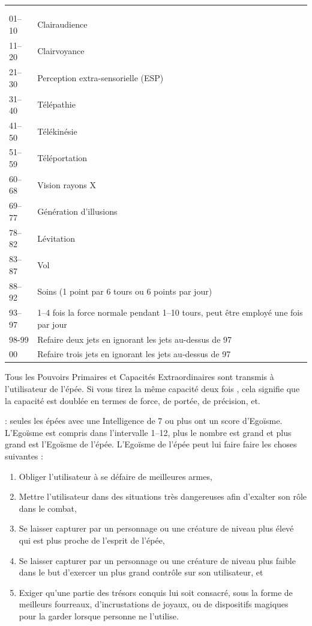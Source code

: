 \documentclass[12pt]{article}
\newcommand{\myunderline}[1]{\underline{\smash{#1}}}
\begin{document}
{{\begin{tabular}[t]{p{3cm}p{12cm}}
\multicolumn{2}{l}{\myunderline{\textbf{Table des Capacités Extraordinaires}}} \\
\textbf{\myunderline{Jet de dé}} & \myunderline{\textbf{Capacité}} \\
01--10 & Clairaudience \\
11--20 & Clairvoyance \\
21--30 & Perception extra-sensorielle (ESP) \\
31--40 & Télépathie \\
41--50 & Télékinésie \\
51--59 & Téléportation \\
60--68 & Vision rayons X \\
69--77 & Génération d'illusions \\
78--82 & Lévitation \\
83--87 & Vol \\
88--92 & Soins (1 point par 6 tours ou 6 points par jour) \\
93--97 & 1--4 fois la force normale pendant 1--10 tours, peut être employé une fois par jour \\
98-99 & Refaire deux jets en ignorant les jets au-dessus de 97 \\
\hspace{0.4cm}00 & Refaire trois jets en ignorant les jets au-dessus de 97 \\
\end{tabular}

\medskip

Tous les Pouvoirs Primaires et Capacités Extraordinaires sont transmis à l'utilisateur de l'épée. Si vous tirez la même capacité deux fois , cela signifie que la capacité est doublée en termes de force, de portée, de précision, et.

\bigskip

\myunderline{\textbf{Egoïsme}} : seules les épées avec une Intelligence de 7 ou plus ont un score d'Egoïsme. L'Egoïsme est compris dans l'intervalle 1--12, plus le nombre est grand et plus grand est l'Egoïsme de l'épée. L'Egoïsme de l'épée peut lui faire faire les choses suivantes :

\begin{enumerate}
\item Obliger l'utilisateur à se défaire de meilleures armes,
\item Mettre l'utilisateur dans des situations très dangereuses afin d'exalter son rôle dans le combat,
\item Se laisser capturer par un personnage ou une créature de niveau plus élevé qui est plus proche de l'esprit de l'épée,
\item Se laisser capturer par un personnage ou une créature de niveau plus faible dans le but d'exercer un plus grand contrôle sur son utilisateur, et
\item Exiger qu'une partie des trésors conquis lui soit consacré, sous la forme de meilleurs fourreaux, d'incrustations de joyaux, ou de dispositifs magiques pour la garder lorsque personne ne l'utilise.
\end{enumerate}

}}
\end{document}
